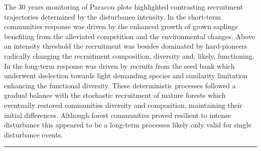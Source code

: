 \documentclass[fleqn,10pt]{ArtEcoFoG} %
\begin{document}
The 30 years monitoring of Paracou plots highlighted contrasting
recruitment trajectories determined by the disturbance intensity. In the
short-term communities response was driven by the enhanced growth of
grown saplings benefiting from the alleviated competition and the
environmental changes. Above an intensity threshold the recruitment was
besides dominated by hard-pioneers radically changing the recruitment
composition, diversity and, likely, functioning. In the long-term
response was driven by recruits from the seed bank which underwent
dselection towards light demanding species and similarity limitation
enhancing the functional diversity. These deterministic processes
followed a gradual balance with the stochastic recruitment of mature
forests which eventually restored communities diversity and composition,
maintaining their initial differences. Although forest communities
proved resilient to intense disturbance this appeared to be a long-term
processes likely only valid for single disturbance events.

\begin{center}\rule{0.5\linewidth}{\linethickness}\end{center}





\end{document}
